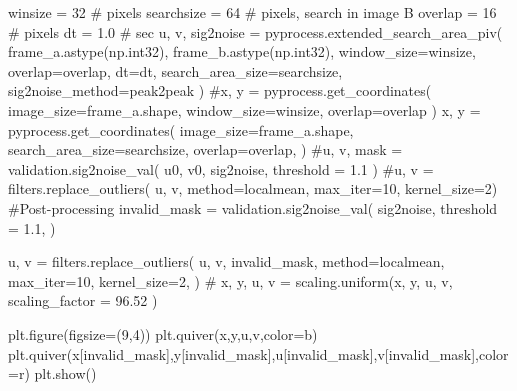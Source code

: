 \documentclass[
  english,
  letterpaper,
  numbers=noendperiod,
  DIV=13]{scrreprt}
\newenvironment{Shaded}{\begin{snugshade}}{\end{snugshade}}
\newcommand{\CommentTok}[1]{\textcolor[rgb]{0.37,0.37,0.37}{#1}}
\newcommand{\DecValTok}[1]{\textcolor[rgb]{0.68,0.00,0.00}{#1}}
\newcommand{\FloatTok}[1]{\textcolor[rgb]{0.68,0.00,0.00}{#1}}
\newcommand{\NormalTok}[1]{\textcolor[rgb]{0.00,0.23,0.31}{#1}}
\newcommand{\OperatorTok}[1]{\textcolor[rgb]{0.37,0.37,0.37}{#1}}
\newcommand{\StringTok}[1]{\textcolor[rgb]{0.13,0.47,0.30}{#1}}
\begin{document}
\begin{Shaded}
\begin{Highlighting}[]
\NormalTok{winsize }\OperatorTok{=} \DecValTok{32} \CommentTok{\# pixels}
\NormalTok{searchsize }\OperatorTok{=} \DecValTok{64}  \CommentTok{\# pixels, search in image B}
\NormalTok{overlap }\OperatorTok{=} \DecValTok{16} \CommentTok{\# pixels}
\NormalTok{dt }\OperatorTok{=} \FloatTok{1.0} \CommentTok{\# sec}
\NormalTok{u, v, sig2noise }\OperatorTok{=}\NormalTok{ pyprocess.extended\_search\_area\_piv( frame\_a.astype(np.int32), frame\_b.astype(np.int32), window\_size}\OperatorTok{=}\NormalTok{winsize, overlap}\OperatorTok{=}\NormalTok{overlap, dt}\OperatorTok{=}\NormalTok{dt, search\_area\_size}\OperatorTok{=}\NormalTok{searchsize, sig2noise\_method}\OperatorTok{=}\StringTok{\textquotesingle{}peak2peak\textquotesingle{}}\NormalTok{ )}
\CommentTok{\#x, y = pyprocess.get\_coordinates( image\_size=frame\_a.shape, window\_size=winsize, overlap=overlap )}
\NormalTok{x, y }\OperatorTok{=}\NormalTok{ pyprocess.get\_coordinates(}
\NormalTok{    image\_size}\OperatorTok{=}\NormalTok{frame\_a.shape,}
\NormalTok{    search\_area\_size}\OperatorTok{=}\NormalTok{searchsize,}
\NormalTok{    overlap}\OperatorTok{=}\NormalTok{overlap,}
\NormalTok{)}
\CommentTok{\#u, v, mask = validation.sig2noise\_val( u0, v0, sig2noise, threshold = 1.1 )}
\CommentTok{\#u, v = filters.replace\_outliers( u, v, method=\textquotesingle{}localmean\textquotesingle{}, max\_iter=10, kernel\_size=2)}
\CommentTok{\#Post{-}processing}
\NormalTok{invalid\_mask }\OperatorTok{=}\NormalTok{ validation.sig2noise\_val(}
\NormalTok{    sig2noise,}
\NormalTok{    threshold }\OperatorTok{=} \FloatTok{1.1}\NormalTok{,}
\NormalTok{)}

\NormalTok{u, v }\OperatorTok{=}\NormalTok{ filters.replace\_outliers(}
\NormalTok{    u, v,}
\NormalTok{    invalid\_mask,}
\NormalTok{    method}\OperatorTok{=}\StringTok{\textquotesingle{}localmean\textquotesingle{}}\NormalTok{,}
\NormalTok{    max\_iter}\OperatorTok{=}\DecValTok{10}\NormalTok{,}
\NormalTok{    kernel\_size}\OperatorTok{=}\DecValTok{2}\NormalTok{,}
\NormalTok{)}
\CommentTok{\# x, y, u, v = scaling.uniform(x, y, u, v, scaling\_factor = 96.52 )}

\NormalTok{plt.figure(figsize}\OperatorTok{=}\NormalTok{(}\DecValTok{9}\NormalTok{,}\DecValTok{4}\NormalTok{))}
\NormalTok{plt.quiver(x,y,u,v,color}\OperatorTok{=}\StringTok{\textquotesingle{}b\textquotesingle{}}\NormalTok{)}
\NormalTok{plt.quiver(x[invalid\_mask],y[invalid\_mask],u[invalid\_mask],v[invalid\_mask],color}\OperatorTok{=}\StringTok{\textquotesingle{}r\textquotesingle{}}\NormalTok{)}
\NormalTok{plt.show()}
\end{Highlighting}
\end{Shaded}
\end{document}
